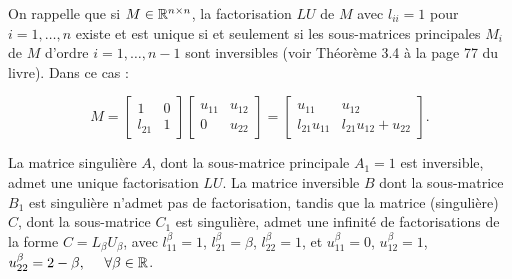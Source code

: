 On rappelle que si $M \in \mathbb{R}^{n \times n}$, la factorisation $LU$ de $M$ avec $l_{ii} = 1$ pour $i = 1, \dots , n$ existe et est unique si et seulement si les sous-matrices principales $M_{i}$ de $M$ d'ordre $i = 1, \dots , n - 1$ sont inversibles (voir Théorème 3.4 à la page 77 du livre).
Dans ce cas :

\begin{equation*}
  M = \begin{bmatrix}
        1       & 0   \\
        l_{21}  & 1
      \end{bmatrix}
      \begin{bmatrix}
        u_{11} & u_{12}   \\
        0      & u_{22}
      \end{bmatrix}
  =
      \begin{bmatrix}
        u_{11}          & u_{12}   \\
        l_{21} u_{11}   & l_{21} u_{12} + u_{22}
      \end{bmatrix}
  .
\end{equation*}

La matrice singulière $A$, dont la sous-matrice principale $A_{1} = 1$ est inversible, admet une unique factorisation $LU$.
La matrice inversible $B$ dont la sous-matrice $B_{1}$ est singulière n'admet pas de factorisation,
tandis que la matrice (singulière) $C$, dont la sous-matrice $C_{1}$ est singulière, admet une infinité de factorisations de la forme $C = L_{\beta} U_{\beta}$,
avec $l^{\beta}_{11} = 1$, $l^{\beta}_{21} = \beta$, $l^{\beta}_{22} = 1$, et $u^{\beta}_{11} = 0$, $u^{\beta}_{12} = 1$, $u^{\beta}_{22} = 2 - \beta, \ \quad \forall \beta \in \mathbb{R}$.

